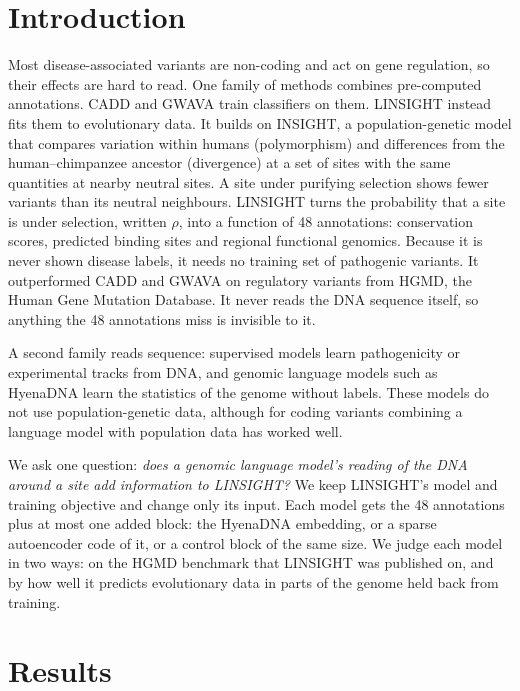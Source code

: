 \documentclass[11pt]{article}
\begin{document}
\section*{Introduction}
Most disease-associated variants are non-coding and act on gene regulation, so their effects are
hard to read. One family of methods combines pre-computed annotations. CADD and GWAVA train classifiers on them. LINSIGHT instead fits them to evolutionary data. It builds on INSIGHT, a population-genetic model that compares variation within humans
(polymorphism) and differences from the human--chimpanzee ancestor (divergence) at a set of sites with
the same quantities at nearby neutral sites. A site under purifying selection shows fewer variants
than its neutral neighbours. LINSIGHT turns the probability that a site is under selection, written
$\rho$, into a function of 48 annotations: conservation scores, predicted binding sites and regional
functional genomics. Because it is never shown disease labels, it needs no training set of pathogenic
variants. It outperformed CADD and GWAVA on regulatory variants from HGMD, the Human Gene Mutation
Database. It never reads the DNA sequence itself, so
anything the 48 annotations miss is invisible to it.

A second family reads sequence: supervised models learn pathogenicity or experimental tracks from DNA, and genomic language models such as HyenaDNA learn the statistics of the genome without labels. These models do not use
population-genetic data, although for coding variants combining a language model with population data
has worked well.

We ask one question: \emph{does a genomic language model's reading of the DNA around a site add
information to LINSIGHT?} We keep LINSIGHT's model and training objective and change only its input. Each model gets the 48 annotations plus at most one added block: the
HyenaDNA embedding, or a sparse autoencoder code of it, or a control block of the same size. We judge
each model in two ways: on the HGMD benchmark that LINSIGHT was published on, and by how well it
predicts evolutionary data in parts of the genome held back from training.


\section*{Results}
\end{document}

